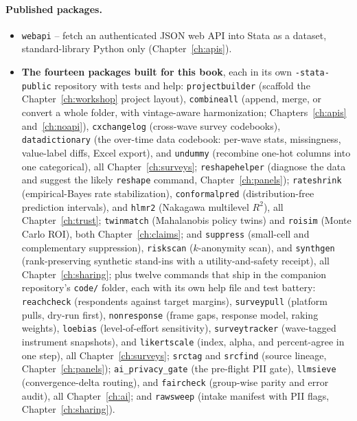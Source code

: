 \documentclass[
    a4paper,
    fontsize=10pt,
    twoside=true,
    numbers=noenddot,
]{kaobook}
\begin{document}
\paragraph{Published packages.}
\begin{itemize}
    \item \texttt{webapi} -- fetch an authenticated JSON web API into Stata as a dataset, standard-library Python only (Chapter~\ref{ch:apis}).
    \item \textbf{The fourteen packages built for this book}, each in its own \texttt{-stata-public} repository with tests and help: \texttt{projectbuilder} (scaffold the Chapter~\ref{ch:workshop} project layout), \texttt{combineall} (append, merge, or convert a whole folder, with vintage-aware harmonization; Chapters~\ref{ch:apis} and~\ref{ch:noapi}), \texttt{cxchangelog} (cross-wave survey codebooks), \texttt{datadictionary} (the over-time data codebook: per-wave stats, missingness, value-label diffs, Excel export), and \texttt{undummy} (recombine one-hot columns into one categorical), all Chapter~\ref{ch:surveys}; \texttt{reshapehelper} (diagnose the data and suggest the likely \texttt{reshape} command, Chapter~\ref{ch:panels}); \texttt{rateshrink} (empirical-Bayes rate stabilization), \texttt{conformalpred} (distribution-free prediction intervals), and \texttt{hlmr2} (Nakagawa multilevel $R^2$), all Chapter~\ref{ch:trust}; \texttt{twinmatch} (Mahalanobis policy twins) and \texttt{roisim} (Monte Carlo ROI), both Chapter~\ref{ch:claims}; and \texttt{suppress} (small-cell and complementary suppression), \texttt{riskscan} ($k$-anonymity scan), and \texttt{synthgen} (rank-preserving synthetic stand-ins with a utility-and-safety receipt), all Chapter~\ref{ch:sharing}; plus twelve commands that ship in the companion repository's \texttt{code/} folder, each with its own help file and test battery: \texttt{reachcheck} (respondents against target margins), \texttt{surveypull} (platform pulls, dry-run first), \texttt{nonresponse} (frame gaps, response model, raking weights), \texttt{loebias} (level-of-effort sensitivity), \texttt{surveytracker} (wave-tagged instrument snapshots), and \texttt{likertscale} (index, alpha, and percent-agree in one step), all Chapter~\ref{ch:surveys}; \texttt{srctag} and \texttt{srcfind} (source lineage, Chapter~\ref{ch:panels}); \texttt{ai\_privacy\_gate} (the pre-flight PII gate), \texttt{llmsieve} (convergence-delta routing), and \texttt{faircheck} (group-wise parity and error audit), all Chapter~\ref{ch:ai}; and \texttt{rawsweep} (intake manifest with PII flags, Chapter~\ref{ch:sharing}).

\end{itemize}
\end{document}
